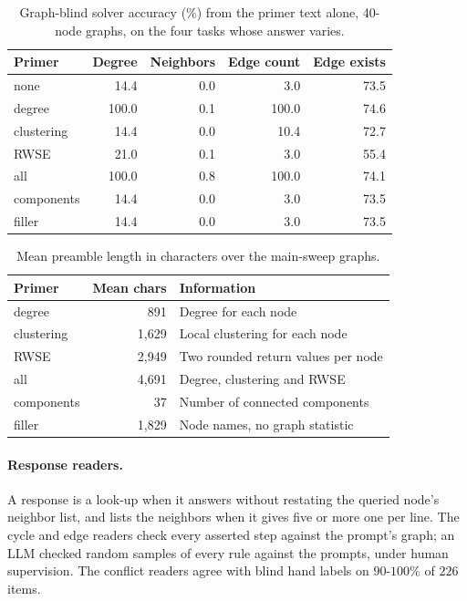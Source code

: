 \documentclass[11pt]{article}
\begin{document}
\begin{table}[h]
\centering\scriptsize
\setlength{\tabcolsep}{4pt}
\begin{tabular}{lrrrr}
\toprule
Primer & Degree & Neighbors & Edge count & Edge exists\\
\midrule
none & 14.4 & 0.0 & 3.0 & 73.5\\ %
degree & 100.0 & 0.1 & 100.0 & 74.6\\ %
clustering & 14.4 & 0.0 & 10.4 & 72.7\\ %
RWSE & 21.0 & 0.1 & 3.0 & 55.4\\ %
all & 100.0 & 0.8 & 100.0 & 74.1\\ %
components & 14.4 & 0.0 & 3.0 & 73.5\\ %
filler & 14.4 & 0.0 & 3.0 & 73.5\\ %
\bottomrule
\end{tabular}
\caption{Graph-blind solver accuracy (\%) from the primer text alone, 40-node graphs, on the four tasks whose answer varies.} %
\label{tab:solver}
\end{table}

\begin{table}[h]
\centering\footnotesize
\setlength{\tabcolsep}{4pt}
\begin{tabular}{lrp{3.1cm}}
\toprule
Primer & Mean chars & Information\\
\midrule
degree & 891 & Degree for each node\\ %
clustering & 1,629 & Local clustering for each node\\ %
RWSE & 2,949 & Two rounded return values per node\\ %
all & 4,691 & Degree, clustering and RWSE\\ %
components & 37 & Number of connected components\\ %
filler & 1,829 & Node names, no graph statistic\\ %
\bottomrule
\end{tabular}
\caption{Mean preamble length in characters over the main-sweep graphs.} %
\label{tab:primerlength}
\end{table}

\paragraph{Response readers.} A response is a look-up when it answers without restating the queried node's neighbor list, and lists the neighbors when it gives five or more one per line. The cycle and edge readers check every asserted step against the prompt's graph; an LLM checked random samples of every rule against the prompts, under human supervision. The conflict readers agree with blind hand labels on $90$-$100\%$ of $226$ items. %
\end{document}
